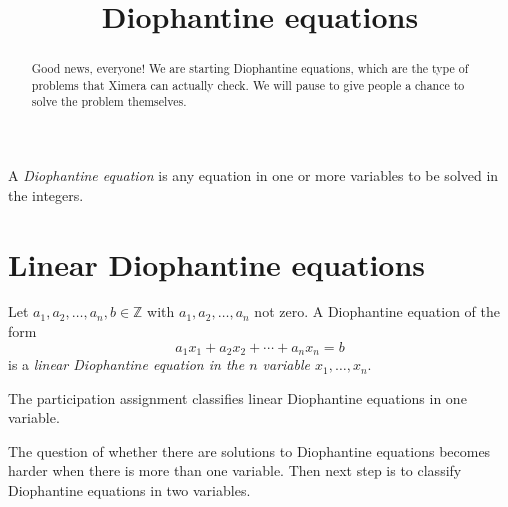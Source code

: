 \documentclass{ximera}
\title{Diophantine equations}
\begin{document}
  
\begin{abstract}  
Good news, everyone! We are starting Diophantine equations, which are the type of problems that Ximera can actually check. We will pause to give people a chance to solve the problem themselves.\end{abstract}  
\maketitle  

\begin{definition}
 A \emph{Diophantine equation} is any equation in one or more variables to be solved in the integers.
\end{definition}

\section*{Linear Diophantine equations}

\begin{definition}
 Let $a_1,a_2,\dots,a_n,b\in\mathbb{Z}$ with $a_1,a_2,\dots,a_n$ not zero. A Diophantine equation of the form \[a_1x_1+a_2x_2+\cdots+a_nx_n=b\] is a \emph{linear Diophantine equation in the $n$ variable $x_1,\dots,x_n$}.
\end{definition}

The participation assignment classifies linear Diophantine equations in one variable.

The question of whether there are solutions to Diophantine equations becomes harder when there is more than one variable. Then next step is to classify Diophantine equations in two variables.
\end{document}
